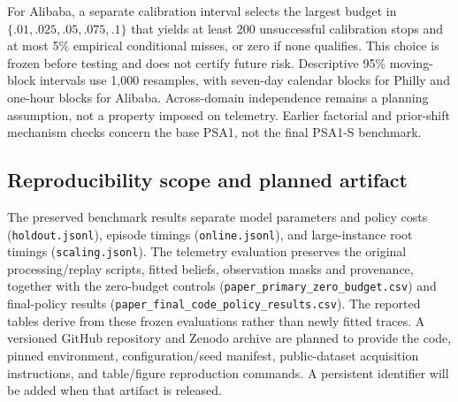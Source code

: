 For Alibaba, a separate calibration interval selects the largest budget in $\{.01,.025,.05,.075,.1\}$ that yields at least 200 unsuccessful calibration stops and at most 5\% empirical conditional misses, or zero if none qualifies. This choice is frozen before testing and does not certify future risk. Descriptive 95\% moving-block intervals use 1,000 resamples, with seven-day calendar blocks for Philly and one-hour blocks for Alibaba. Across-domain independence remains a planning assumption, not a property imposed on telemetry. Earlier factorial and prior-shift mechanism checks concern the base PSA1, not the final PSA1-S benchmark.

\subsection{Reproducibility scope and planned artifact}
The preserved benchmark results separate model parameters and policy costs (\texttt{holdout.jsonl}), episode timings (\texttt{online.jsonl}), and large-instance root timings (\texttt{scaling.jsonl}). The telemetry evaluation preserves the original processing/replay scripts, fitted beliefs, observation masks and provenance, together with the zero-budget controls (\texttt{paper\_primary\_zero\_budget.csv}) and final-policy results (\texttt{paper\_final\_code\_policy\_results.csv}). The reported tables derive from these frozen evaluations rather than newly fitted traces. A versioned GitHub repository and Zenodo archive are planned to provide the code, pinned environment, configuration/seed manifest, public-dataset acquisition instructions, and table/figure reproduction commands. A persistent identifier will be added when that artifact is released.

